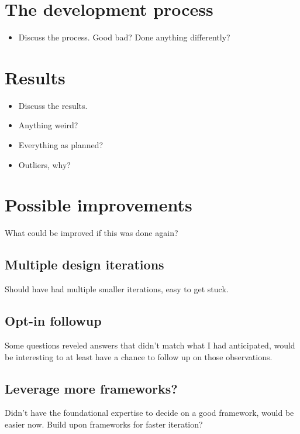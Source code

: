 \section{The development process}


  \begin{itemize}
    \item{Discuss the process. Good bad? Done anything differently?}
  \end{itemize}

\section{Results}

  \begin{itemize}
    \item{Discuss the results.}
    \item{Anything weird?}
    \item{Everything as planned?}
    \item{Outliers, why?}
  \end{itemize}

\section{Possible improvements}

  What could be improved if this was done again?

  \subsection{Multiple design iterations}

    Should have had multiple smaller iterations, easy to get stuck.

  \subsection{Opt-in followup}

    Some questions reveled answers that didn't match what I had
    anticipated, would be interesting to at least have a chance to follow
    up on those observations.

  \subsection{Leverage more frameworks?}

    Didn't have the foundational expertise to decide on a good
    framework, would be easier now.
    Build upon frameworks for faster iteration?

